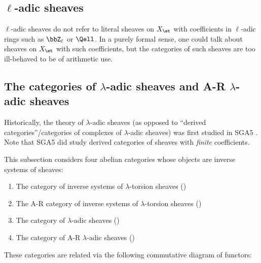 \subsection{\texorpdfstring{$\ell$}{ell}-adic sheaves}

$\ell$-adic sheaves do not refer to literal sheaves on $X_{\et}$ with coefficients in $\ell$-adic rings such as $\bbZ_\ell$ or $\Qell$. In a purely formal sense, one could talk about sheaves on $X_{\et}$ with such coefficients, but the categories of such sheaves are too ill-behaved to be of arithmetic use. 



\subsection{The categories of \texorpdfstring{$\lambda$}{lambda}-adic sheaves and A-R \texorpdfstring{$\lambda$}{lambda}-adic sheaves}

Historically, the theory of $\lambda$-adic sheaves (as opposed to ``derived categories''/categories of complexes of $\lambda$-adic sheaves) was first studied in SGA5 \cite[Expos\'e V]{SGA5}. Note that SGA5 \cite[Expos\'e III]{SGA5} did study derived categories of sheaves with \emph{finite} coefficients.

This subsection considers four abelian categories whose objects are inverse systems of sheaves:
\begin{enumerate}
    \item The category of inverse systems of $\lambda$-torsion sheaves ()
    \item The A-R category of inverse systems of $\lambda$-torsion sheaves ()
    \item The category of $\lambda$-adic sheaves ()
    \item The category of A-R $\lambda$-adic sheaves ()
\end{enumerate}

These categories are related via the following commutative diagram of functors:
\begin{center}
\end{center}

